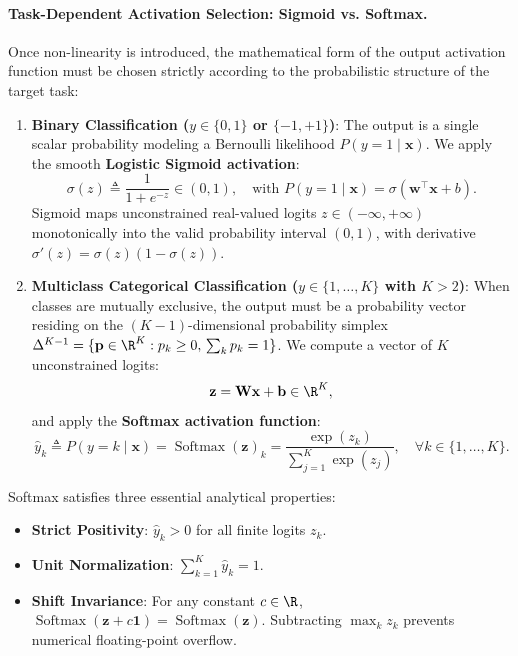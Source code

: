 \paragraph{Task-Dependent Activation Selection: Sigmoid vs. Softmax.}
Once non-linearity is introduced, the mathematical form of the output activation function must be chosen strictly according to the probabilistic structure of the target task:
\begin{enumerate}
  \item \textbf{Binary Classification ($y \in \{0, 1\}$ or $\{-1, +1\}$)}:
    The output is a single scalar probability modeling a Bernoulli likelihood $P(y = 1 \mid \mathbf{x})$. We apply the smooth \textbf{Logistic Sigmoid activation}:
    \begin{equation}
    \sigma(z) \triangleq \frac{1}{1 + e^{-z}} \in (0, 1), \quad \text{with } P(y = 1 \mid \mathbf{x}) = \sigma(\mathbf{w}^\top \mathbf{x} + b).
    \label{eq:sigmoid_formula}
    \end{equation}
    Sigmoid maps unconstrained real-valued logits $z \in (-\infty, +\infty)$ monotonically into the valid probability interval $(0, 1)$, with derivative $\sigma'(z) = \sigma(z)(1 - \sigma(z))$.
  \item \textbf{Multiclass Categorical Classification ($y \in \{1, \dots, K\}$ with $K > 2$)}:
    When classes are mutually exclusive, the output must be a probability vector residing on the $(K-1)$-dimensional probability simplex $\Delta^{K-1} = \{\mathbf{p} \in \R^K : p_k \ge 0, \, \sum_k p_k = 1\}$. We compute a vector of $K$ unconstrained logits:
    \begin{equation}
    \mathbf{z} = \mathbf{W}\mathbf{x} + \mathbf{b} \in \R^K,
    \end{equation}
    and apply the \textbf{Softmax activation function}:
    \begin{equation}
    \hat{y}_k \triangleq P(y = k \mid \mathbf{x}) = \operatorname{Softmax}(\mathbf{z})_k = \frac{\exp(z_k)}{\sum_{j=1}^K \exp(z_j)}, \quad \forall k \in \{1, \dots, K\}.
    \label{eq:softmax_definition}
    \end{equation}
\end{enumerate}

Softmax satisfies three essential analytical properties:
\begin{itemize}[noitemsep]
  \item \textbf{Strict Positivity}: $\hat{y}_k > 0$ for all finite logits $z_k$.
  \item \textbf{Unit Normalization}: $\sum_{k=1}^K \hat{y}_k = 1$.
  \item \textbf{Shift Invariance}: For any constant $c \in \R$, $\operatorname{Softmax}(\mathbf{z} + c \mathbf{1}) = \operatorname{Softmax}(\mathbf{z})$. Subtracting $\max_k z_k$ prevents numerical floating-point overflow.
\end{itemize}

